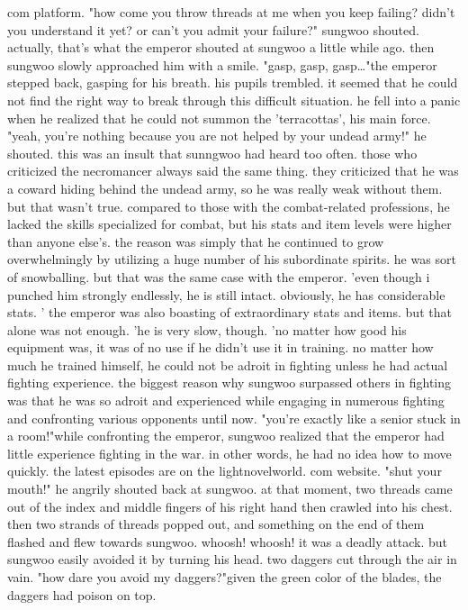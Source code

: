 com platform.
"how come you throw threads at me when you keep failing? didn't you understand it yet? or can't you admit your failure?" sungwoo shouted.
actually, that's what the emperor shouted at sungwoo a little while ago.
 then sungwoo slowly approached him with a smile.
"gasp, gasp, gasp…"the emperor stepped back, gasping for his breath.
 his pupils trembled.
it seemed that he could not find the right way to break through this difficult situation.
 he fell into a panic when he realized that he could not summon the 'terracottas', his main force.
 "yeah, you're nothing because you are not helped by your undead army!" he shouted.
 this was an insult that sunngwoo had heard too often.
 those who criticized the necromancer always said the same thing.
 they criticized that he was a coward hiding behind the undead army, so he was really weak without them.
but that wasn't true.
compared to those with the combat-related professions, he lacked the skills specialized for combat, but his stats and item levels were higher than anyone else's.
the reason was simply that he continued to grow overwhelmingly by utilizing a huge number of his subordinate spirits.
 he was sort of snowballing.
but that was the same case with the emperor.
'even though i punched him strongly endlessly, he is still intact.
 obviously, he has considerable stats.
'
the emperor was also boasting of extraordinary stats and items.
 but that alone was not enough.
'he is very slow, though.
'no matter how good his equipment was, it was of no use if he didn't use it in training.
 no matter how much he trained himself, he could not be adroit in fighting unless he had actual fighting experience.
the biggest reason why sungwoo surpassed others in fighting was that he was so adroit and experienced while engaging in numerous fighting and confronting various opponents until now.
"you're exactly like a senior stuck in a room!"while confronting the emperor, sungwoo realized that the emperor had little experience fighting in the war.
 in other words, he had no idea how to move quickly.
 the latest episodes are on the lightnovelworld.
com website.
"shut your mouth!" he angrily shouted back at sungwoo.
 at that moment, two threads came out of the index and middle fingers of his right hand then crawled into his chest.
 then two strands of threads popped out, and something on the end of them flashed and flew towards sungwoo.
 whoosh! whoosh! it was a deadly attack.
 but sungwoo easily avoided it by turning his head.
 two daggers cut through the air in vain.
"how dare you avoid my daggers?"given the green color of the blades, the daggers had poison on top.
